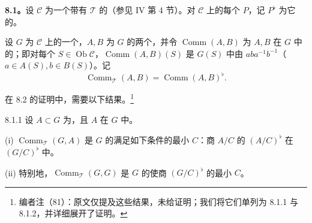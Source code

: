 \textbf{8.1。}设 $\mathscr C$ 为一个带有 $\mathscr T$ 的（参见 IV 第 4 节）。对 $\mathscr C$ 上的每个 $P$，记 $P^\flat$ 为它的。

设 $G$ 为 $\mathscr C$ 上的一个，$A,B$ 为 $G$ 的两个，并令 $\operatorname{Comm}(A,B)$ 为 $A,B$ 在 $G$ 中的；即对每个 $S\in\operatorname{Ob}\mathscr C$，$\operatorname{Comm}(A,B)(S)$ 是 $G(S)$ 中由 $aba^{-1}b^{-1}$（$a\in A(S),b\in B(S)$）。记
\[
\operatorname{Comm}_{\mathscr T}(A,B)=\operatorname{Comm}(A,B)^\flat.
\]

在 8.2 的证明中，需要以下结果。\footnote{编者注（81）：原文仅提及这些结果，未给证明；我们将它们单列为 8.1.1 与 8.1.2，并详细展开了证明。}
\begin{SGAresult}{}{8.1.1}
设 $A\subset G$ 为，且 $A$ 在 $G$ 中。

(i) $\operatorname{Comm}_{\mathscr T}(G,A)$ 是 $G$ 的满足如下条件的最小 $C$：商 $A/C$ 的 $(A/C)^\flat$ 在 $(G/C)^\flat$ 中。

(ii) 特别地，$\operatorname{Comm}_{\mathscr T}(G,G)$ 是 $G$ 的使商 $(G/C)^\flat$ 的最小 $C$。
\end{SGAresult}
